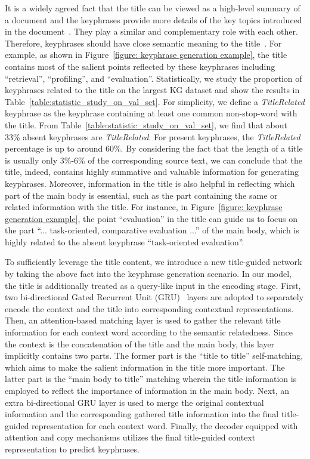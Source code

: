 \documentclass[letterpaper]{article} %
\begin{document}
It is a widely agreed fact that the title can be viewed as a high-level summary of a document and the keyphrases provide more details of the key topics introduced in the document~\cite{li2010semi_title}. They play a similar and complementary role with each other. Therefore, keyphrases should have close semantic meaning to the title~\cite{li2010semi_title}. For example, as shown in Figure~\ref{figure: keyphrase generation example}, the title contains most of the salient points reflected by these keyphrases including ``retrieval'', ``profiling'', and ``evaluation''. Statistically, we study the proportion of keyphrases related to the title on the largest KG dataset and show the results in Table~\ref{table:statistic_study_on_val_set}. For simplicity, we define a \textit{TitleRelated} keyphrase as the keyphrase containing at least one common non-stop-word with the title. From Table~\ref{table:statistic_study_on_val_set}, we find that about 33\% absent keyphrases are \textit{TitleRelated}. For present keyphrases, the \textit{TitleRelated} percentage is up to around 60\%. By considering the fact that the length of a title is usually only 3\%-6\% of the corresponding source text, we can conclude that the title, indeed, contains highly summative and valuable information for generating keyphrases.
Moreover, information in the title is also helpful in reflecting which part of the main body is essential, such as the part containing the same or related information with the title. For instance, in Figure~\ref{figure: keyphrase generation example}, the point ``evaluation'' in the title can guide us to focus on the part ``... task-oriented, comparative evaluation ...'' of the main body, which is highly related to the absent keyphrase ``task-oriented evaluation''.


To sufficiently leverage the title content, we introduce a new title-guided network by taking the above fact into the keyphrase generation scenario. In our model, the title is additionally treated as a query-like input in the encoding stage. First, two bi-directional Gated Recurrent Unit (GRU)~\cite{cho2014learning} layers are adopted to separately encode the context and the title into corresponding contextual representations. Then, an attention-based matching layer is used to gather the relevant title information for each context word according to the semantic relatedness. Since the context is the concatenation of the title and the main body, this layer implicitly contains two parts. The former part is the ``title to title'' self-matching, which aims to make the salient information in the title more important. The latter part is the ``main body to title'' matching wherein the title information is employed to reflect the importance of information in the main body. Next, an extra bi-directional GRU layer is used to merge the original contextual information and the corresponding gathered title information into the final title-guided representation for each context word. Finally, the decoder equipped with attention and copy mechanisms utilizes the final title-guided context representation to predict keyphrases.
\end{document}
